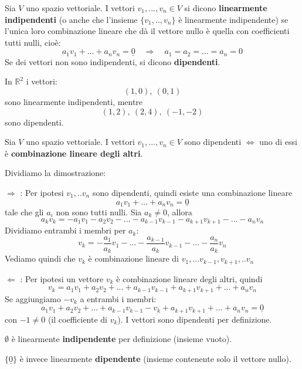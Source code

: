 \documentclass[
  a4paper,
]{article}
\begin{document}
\begin{definitionbox}
Sia \(V\) uno spazio vettoriale. I vettori \(v_1, ..., v_n \in V\) si
dicono \textbf{linearmente indipendenti} (o anche che l'insieme
\(\{v_1, .., v_n\}\) è linearmente indipendente) se l'unica loro
combinazione lineare che dà il vettore nullo è quella con coefficienti
tutti nulli, cioè: \[
a_1v_1 + ... + a_n v_n = \underline{0} \quad\Longrightarrow\quad a_1 = a_2 = ... = a_n = 0
\] Se dei vettori non sono indipendenti, si dicono \textbf{dipendenti}.
\end{definitionbox}

\begin{examplebox}
In \(\mathbb{R}^2\) i vettori: \[  
(1,0), \ (0,1)  
\] sono linearmente indipendenti, mentre \[  
(1,2), \ (2,4), \ (-1,-2)  
\] sono dipendenti.
\end{examplebox}

\begin{propositionbox}
Sia \(V\) uno spazio vettoriale. I vettori \(v_1, ..., v_n \in V\) sono
dipendenti \(\iff\) uno di essi è \textbf{combinazione lineare degli
altri}.
\end{propositionbox}

\begin{proofbox}
Dividiamo la dimostrazione:

\(\Rightarrow\) : Per ipotesi \(v_1, .. v_n\) sono dipendenti, quindi
esiste una combinazione lineare \[
a_1v_1 + ... + a_n v_n = \underline{0} 
\] tale che gli \(a_i\) non sono tutti nulli. Sia \(a_k \neq 0\), allora
\[
a_k v_k = - a_1 v_1 -a_2 v_2 - ... - a_{k-1}v_{k-1}-a_{k+1}v_{k+1} -...- a_n v_n
\] Dividiamo entrambi i membri per \(a_k\): \[
v_k = - \frac{a_1}{a_k} v_1 - ... - \frac{a_{k-1}}{a_k}v_{k-1} -... - \frac{a_n}{a_k}v_n
\] Vediamo quindi che \(v_k\) è combinazione lineare di
\(v_1, ... v_{k-1}, v_{k+1}, .. v_n\)

\(\Leftarrow\) : Per ipotesi un vettore \(v_k\) è combinazione lineare
degli altri, quindi \[
v_k = a_1 v_1 + a_2 v_2 + ... + a_{k-1}v_{k-1}+a_{k+1}v_{k+1} +...+ a_n v_n
\] Se aggiungiamo \(-v_k\) a entrambi i membri: \[
a_1 v_1 + a_2 v_2 + ... + a_{k-1}v_{k-1}-v_k +a_{k+1}v_{k+1} +...+ a_n v_n = \underline{0}
\] con \(-1 \neq 0\) (il coefficiente di \(v_k\)). I vettori sono
dipendenti per definizione.
\end{proofbox}

\begin{observationbox}
\(\emptyset\) è linearmente \textbf{indipendente} per definizione
(insieme vuoto).

\(\{\underline{0}\}\) è invece linearmente \textbf{dipendente} (insieme
contenente solo il vettore nullo).
\end{observationbox}
\end{document}
